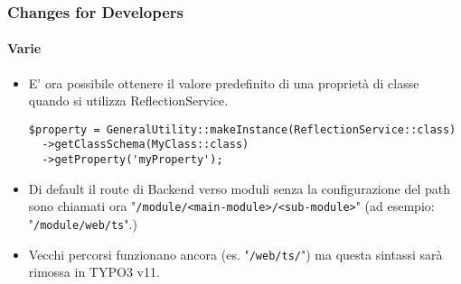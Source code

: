 \begin{frame}[fragile]
	\frametitle{Changes for Developers}
	\framesubtitle{Varie}

	\lstset{basicstyle=\tiny\ttfamily}

	\begin{itemize}
		\item E' ora possibile ottenere il valore predefinito di una proprietà di classe
		    quando si utilizza ReflectionService.

\begin{lstlisting}
$property = GeneralUtility::makeInstance(ReflectionService::class)
  ->getClassSchema(MyClass::class)
  ->getProperty('myProperty');
\end{lstlisting}

		\item Di default il route di Backend verso moduli senza la configurazione del path sono chiamati ora\newline
			"\texttt{/module/<main-module>/<sub-module>}"\newline
			\small
				(ad esempio: "\texttt{/module/web/ts}".)
			\normalsize

		\item Vecchi percorsi funzionano ancora (es. "\texttt{/web/ts/}") ma questa sintassi sarà rimossa in TYPO3 v11.

	\end{itemize}

\end{frame}


